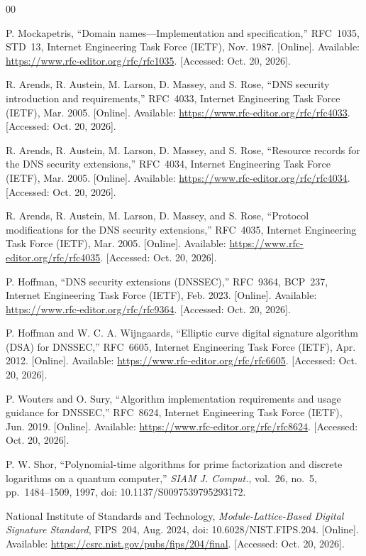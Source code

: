 \documentclass[conference]{IEEEtran}
\begin{document}
\begin{thebibliography}{00}

 P. Mockapetris, ``Domain names---Implementation and specification,'' RFC~1035, STD~13, Internet Engineering Task Force (IETF), Nov. 1987. [Online]. Available: \url{https://www.rfc-editor.org/rfc/rfc1035}. [Accessed: Oct. 20, 2026].

 R. Arends, R. Austein, M. Larson, D. Massey, and S. Rose, ``DNS security introduction and requirements,'' RFC~4033, Internet Engineering Task Force (IETF), Mar. 2005. [Online]. Available: \url{https://www.rfc-editor.org/rfc/rfc4033}. [Accessed: Oct. 20, 2026].

 R. Arends, R. Austein, M. Larson, D. Massey, and S. Rose, ``Resource records for the DNS security extensions,'' RFC~4034, Internet Engineering Task Force (IETF), Mar. 2005. [Online]. Available: \url{https://www.rfc-editor.org/rfc/rfc4034}. [Accessed: Oct. 20, 2026].

 R. Arends, R. Austein, M. Larson, D. Massey, and S. Rose, ``Protocol modifications for the DNS security extensions,'' RFC~4035, Internet Engineering Task Force (IETF), Mar. 2005. [Online]. Available: \url{https://www.rfc-editor.org/rfc/rfc4035}. [Accessed: Oct. 20, 2026].

 P. Hoffman, ``DNS security extensions (DNSSEC),'' RFC~9364, BCP~237, Internet Engineering Task Force (IETF), Feb. 2023. [Online]. Available: \url{https://www.rfc-editor.org/rfc/rfc9364}. [Accessed: Oct. 20, 2026].

 P. Hoffman and W. C. A. Wijngaards, ``Elliptic curve digital signature algorithm (DSA) for DNSSEC,'' RFC~6605, Internet Engineering Task Force (IETF), Apr. 2012. [Online]. Available: \url{https://www.rfc-editor.org/rfc/rfc6605}. [Accessed: Oct. 20, 2026].

 P. Wouters and O. Sury, ``Algorithm implementation requirements and usage guidance for DNSSEC,'' RFC~8624, Internet Engineering Task Force (IETF), Jun. 2019. [Online]. Available: \url{https://www.rfc-editor.org/rfc/rfc8624}. [Accessed: Oct. 20, 2026].

 P. W. Shor, ``Polynomial-time algorithms for prime factorization and discrete logarithms on a quantum computer,'' \emph{SIAM J. Comput.}, vol.~26, no.~5, pp.~1484--1509, 1997, doi: 10.1137/S0097539795293172.

 National Institute of Standards and Technology, \emph{Module-Lattice-Based Digital Signature Standard}, FIPS~204, Aug. 2024, doi: 10.6028/NIST.FIPS.204. [Online]. Available: \url{https://csrc.nist.gov/pubs/fips/204/final}. [Accessed: Oct. 20, 2026].


\end{thebibliography}
\end{document}
